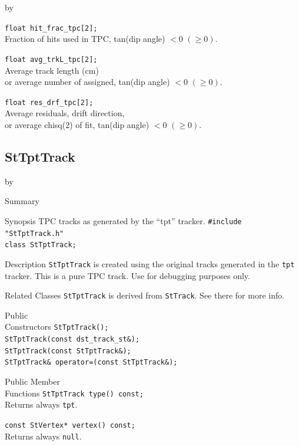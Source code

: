 \documentclass[twoside]{article}
\newcommand{\entrylabel}[1]{\mbox{\textbf{{#1}}}\hfil}%
\newenvironment{entry}
{\begin{list}{}%
    {\renewcommand{\makelabel}{\entrylabel}%
     \setlength{\labelwidth}{90pt}%
     \setlength{\leftmargin}{\labelwidth}
     \advance\leftmargin by \labelsep%
      }%
    }%
  {\end{list}}
\newcommand{\Entrylabel}[1]%
{\raisebox{0pt}[1ex][0pt]{\makebox[\labelwidth][l]%
    {\parbox[t]{\labelwidth}{\hspace{0pt}\textbf{{#1}}}}}}
\newenvironment{Entry}%
{\renewcommand{\entrylabel}{\Entrylabel}\begin{entry}}%
  {\end{entry}}
\begin{document}
\begin{Entry}
    \verb+float hit_frac_tpc[2];+\\
    Fraction of hits used in TPC, tan(dip angle) $< 0$ $(\ge 0)$.
    
    \verb+float avg_trkL_tpc[2];+\\
    Average track length (cm) \\ or average number of assigned,
    tan(dip angle) $< 0$ $(\ge 0)$.
    
    \verb+float res_drf_tpc[2];+\\
    Average residuals, drift direction, \\ or average chisq(2) of fit,
    tan(dip angle) $< 0$ $(\ge 0)$.
\end{Entry}
\clearpage

\subsection{StTptTrack}
\label{sec:StTptTrack}
\begin{Entry}
\item[Summary]
\item[Synopsis] TPC tracks as generated by the ``tpt'' tracker.
    \verb+#include "StTptTrack.h"+\\
    \verb+class StTptTrack;+\\
\item[Description] \texttt{StTptTrack} is created using the original
     tracks generated in the \texttt{tpt} tracker. This is a pure TPC track.
     Use for debugging purposes only.

\item[Related Classes] \texttt{StTptTrack} is derived from
    \texttt{StTrack}. See there for more info.
    
\item[Public\\ Constructors]
    \verb+StTptTrack();+\\
    \verb+StTptTrack(const dst_track_st&);+\\
    \verb+StTptTrack(const StTptTrack&);+\\
    \verb+StTptTrack& operator=(const StTptTrack&);+\\
\item[Public Member\\ Functions]
    \verb+StTptTrack type() const;+\\
    Returns always \texttt{tpt}.

    \verb+const StVertex* vertex() const;+\\
    Returns always \texttt{null}.
\end{Entry}
\clearpage
\end{document}

